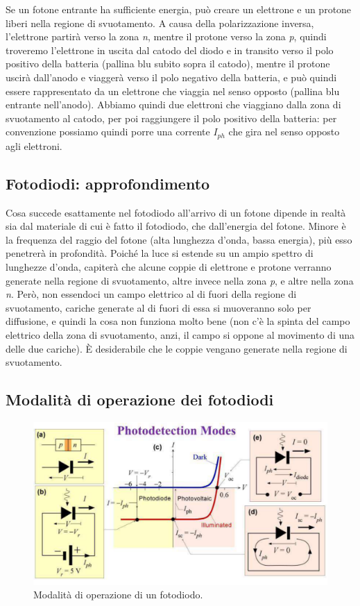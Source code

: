 \documentclass[a4paper,11pt]{article}
\begin{document}
Se un fotone entrante ha sufficiente energia, può creare un elettrone e un protone liberi nella regione di svuotamento.
A causa della polarizzazione inversa, l'elettrone partirà verso la zona \textit{n}, mentre il protone verso la zona \textit{p},
quindi troveremo l'elettrone in uscita dal catodo del diodo e in transito verso il polo positivo della batteria (pallina blu subito sopra il catodo),
mentre il protone uscirà dall'anodo e viaggerà verso il polo negativo della batteria, e può quindi essere rappresentato
da un elettrone che viaggia nel senso opposto (pallina blu entrante nell'anodo). Abbiamo quindi due elettroni che viaggiano dalla zona di svuotamento al catodo, per poi raggiungere il polo
positivo della batteria: per convenzione possiamo quindi porre una corrente $I_{ph}$ che gira nel senso opposto agli elettroni.

\subsection{Fotodiodi: approfondimento}
Cosa succede esattamente nel fotodiodo all'arrivo di un fotone dipende in realtà sia dal materiale di cui è fatto
il fotodiodo, che dall'energia del fotone. Minore è la frequenza del raggio del fotone (alta lunghezza d'onda, bassa energia), più
esso penetrerà in profondità. Poiché la luce si estende su un ampio spettro di lunghezze d'onda, capiterà
che alcune coppie di elettrone e protone verranno generate nella regione di svuotamento, altre invece nella zona \textit{p},
e altre nella zona \textit{n}. Però, non essendoci un campo elettrico al di fuori della regione di svuotamento, cariche generate al di fuori di essa
si muoveranno solo per diffusione, e quindi la cosa non funziona molto bene (non c'è la spinta del campo elettrico della zona di svuotamento, anzi, il campo si oppone al movimento
di una delle due cariche). È desiderabile che le coppie vengano generate nella regione di svuotamento.

\subsection{Modalità di operazione dei fotodiodi}

\renewcommand{\thefigure}{3.3}
\begin{figure}[!h]
  \centering
    \includegraphics[scale=0.4]{images/3/photodiode_modes.png}
    \caption{Modalità di operazione di un fotodiodo.}
\end{figure}
\end{document}
